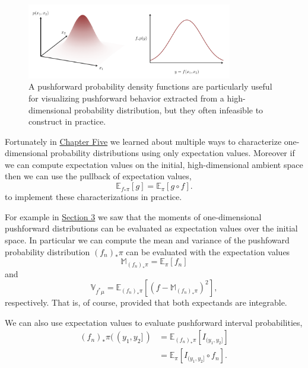 \documentclass[
  letterpaper,
  DIV=11,
  numbers=noendperiod]{scrartcl}
\begin{document}
\begin{figure}

{\centering \includegraphics[width=0.8\textwidth,height=\textheight]{figures/pushforward_characterizations/density/density.pdf}

}

\caption{\label{fig-pushforward-characterizations-density}A pushforward
probability density functions are particularly useful for visualizing
pushforward behavior extracted from a high-dimensional probability
distribution, but they often infeasible to construct in practice.}

\end{figure}

Fortunately in
\href{https://betanalpha.github.io/assets/chapters_html/expectation_values.html}{Chapter
Five} we learned about multiple ways to characterize one-dimensional
probability distributions using only expectation values. Moreover if we
can compute expectation values on the initial, high-dimensional ambient
space then we can use the pullback of expectation values, \[
\mathbb{E}_{f_{*} \pi}[ g ] = \mathbb{E}_{\pi} [ g \circ f ].
\] to implement these characterizations in practice.

For example in \href{@sec:transforming-integrals}{Section 3} we saw that
the moments of one-dimensional pushforward distributions can be
evaluated as expectation values over the initial space. In particular we
can compute the mean and variance of the pushfoward probability
distribution \((f_{n})_{*} \pi\) can be evaluated with the expectation
values \[
\mathbb{M}_{(f_{n})_{*} \pi}
=
\mathbb{E}_{\pi} [ f_{n} ]
\] and \[
\mathbb{V}_{f^{*} \mu}
=
\mathbb{E}_{(f_{n})_{*} \pi} [ (f - \mathbb{M}_{(f_{n})_{*} \pi})^{2} ],
\] respectively. That is, of course, provided that both expectands are
integrable.

We can also use expectation values to evaluate pushforward interval
probabilities, \begin{align*}
(f_{n})_{*} \pi( \, (y_{1}, y_{2} ] \, )
&=
\mathbb{E}_{(f_{n})_{*} \pi} \left[ I_{(y_{1}, y_{2} ]} \right]
\\
&=
\mathbb{E}_{\pi} \left[ I_{(y_{1}, y_{2} ]} \circ f_{n} \right].
\end{align*}
\end{document}
